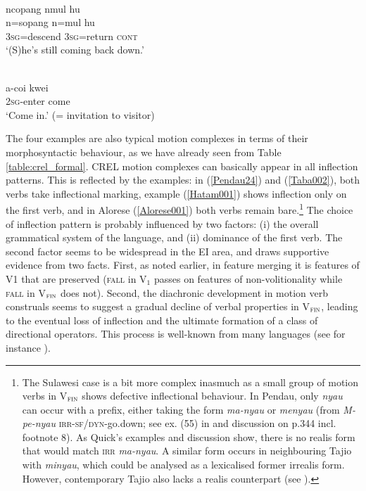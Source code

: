 \ea \label{Taba002}
\\
\glll ncopang nmul hu \\
n=sopang n=mul hu \\
\textsc{3}\textsc{sg}=descend \textsc{3}\textsc{sg}=return \textsc{cont} \\
\glft `(S)he's still coming back down.'\\ 
\z

\ea \label{Hatam001}
\\
\gll a-coi kwei \\
\textsc{2}\textsc{sg}-enter come \\
\glft `Come in.' (= invitation to visitor)\\ 
\z

The four examples are also typical motion complexes in terms of their morphosyntactic behaviour, as we have already seen from Table \ref{table:crel_formal}. CREL motion complexes can basically appear in all inflection patterns. This is reflected by the examples: in (\ref{Pendau24}) and (\ref{Taba002}), both verbs take inflectional marking, example (\ref{Hatam001}) shows inflection only on the first verb, and in Alorese (\ref{Alorese001}) both verbs remain bare.\footnote{The Sulawesi case is a bit more complex inasmuch as a small group of motion verbs in V$_{\textsc{fin}}$ shows defective inflectional behaviour. In Pendau, only \textit{nyau} can occur with a prefix, either taking the form \textit{ma-nyau} or \textit{menyau} (from \textit{M-pe-nyau} \textsc{irr}-\textsc{sf/dyn}-go.down; see ex. (55) in \citealt[342]{Quick2007} and discussion on p.344 incl. footnote 8). As Quick's examples and discussion show, there is no realis form that would match \textsc{irr} \textit{ma-nyau}. A similar form occurs in neighbouring Tajio with \textit{minyau}, which could be analysed as a lexicalised former irrealis form. However, contemporary Tajio also lacks a realis counterpart (see \citealt[136]{mayani2013grammar}).} The choice of inflection pattern is probably influenced by two factors: (i) the overall grammatical system of the language, and (ii) dominance of the first verb. The second factor seems to be widespread in the EI area, and draws supportive evidence from two facts. First, as noted earlier, in feature merging it is features of V1 that are preserved (\textsc{fall} in V$_{1}$ passes on features of non-volitionality while \textsc{fall} in V$_{\textsc{fin}}$ does not). Second, the diachronic development in motion verb construals seems to suggest a gradual decline of verbal properties in V$_{\textsc{fin}}$, leading to the eventual loss of inflection and the ultimate formation of a class of directional operators. This process is well-known from many languages (see for instance \citealt[31]{Aikhenvald2006}).

